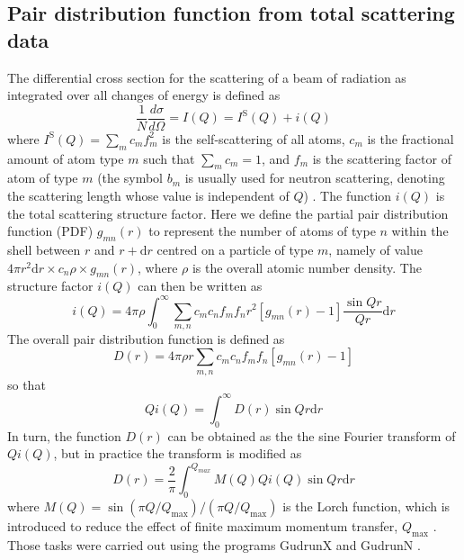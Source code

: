 \documentclass[twoside,twocolumn,9pt]{article}
\begin{document}
\subsection{Pair distribution function from total scattering data}
The differential cross section for the scattering of a beam of radiation as integrated over all changes of energy is defined as
\begin{equation}
\frac{1}{N}\frac{d\sigma}{d\Omega}=I(Q)=I^\mathrm{S}(Q)+i(Q)
\end{equation}
where $I^\mathrm{S}(Q)=  \sum_m c_m f_m^2 $ is the self-scattering of all atoms, $c_m$ is the fractional amount of atom type $m$ such that $\sum_m c_m = 1$, and $f_m$ is the scattering factor of atom of type $m$ (the symbol $b_m$ is usually used for neutron scattering, denoting the scattering length whose value is independent of $Q$) \cite{Keen:2001wc}. The function $i(Q)$ is the total scattering structure factor. Here we define the partial pair distribution function (PDF) $g_{mn}(r)$ to represent the number of atoms of type $n$ within the shell between $r$ and  $r+\mathrm{d}r$ centred on a particle of type $m$, namely of value $4 \pi r^2 \mathrm{d}r \times c_n \rho \times g_{mn}(r)$,  where $\rho$ is the overall atomic number density. The structure factor $i(Q)$ can then be written as \cite{Dove2002}
\begin{equation} \label{eq:iQ}
i(Q)=4\pi\rho\int^{\infty}_{0}\sum_{m,n}c_m c_n f_m f_n r^2 [g_{mn}(r)-1]\frac{\sin{Qr}}{Qr} \mathrm{d}r
\end{equation}
 The overall pair distribution function is defined as
\begin{equation}\label{eq:Dr}
D(r)=4\pi\rho r \sum_{m,n}c_m c_n f_m f_n [g_{mn}(r)-1]
\end{equation}
so that
\begin{equation}
Qi(Q)=\int^{\infty}_{0} D(r) \sin{Qr} \mathrm{d}r
\end{equation}
In turn, the function $D(r)$ can be obtained as the the sine Fourier transform of $Qi(Q)$, but in practice the transform is modified as
\begin{equation}\label{eq:Dr2}
D(r)=\frac{2}{\pi}\int^{Q_{max}}_{0} M(Q)Qi(Q)\sin{Qr} \mathrm{d}r
\end{equation}
where $M(Q) = \sin(\pi Q/Q_\mathrm{max})/(\pi Q/Q_\mathrm{max})$ is the Lorch function, which is introduced to reduce the effect of finite maximum momentum transfer, $Q_\mathrm{max}$ \cite{Lorch:1969js, Dove2002, Soper:2012kr}. Those tasks were carried out using the programs GudrunX and GudrunN \cite{Soper:2011fda,Soper:2012vs}.
\end{document}
